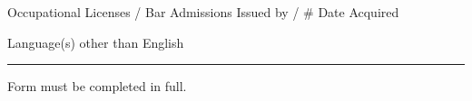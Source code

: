 \documentclass[12pt]{article}
\begin{document}
Occupational Licenses / Bar Admissions \underline{\hspace{4cm}} Issued by / \# \underline{\hspace{4cm}} Date Acquired \underline{\hspace{4cm}}

Language(s) other than English

  

\vfill
\rule{\textwidth}{0.4pt}
\textcolor{sectiontitle}{\footnotesize{Form must be completed in full.}}
\end{document}
